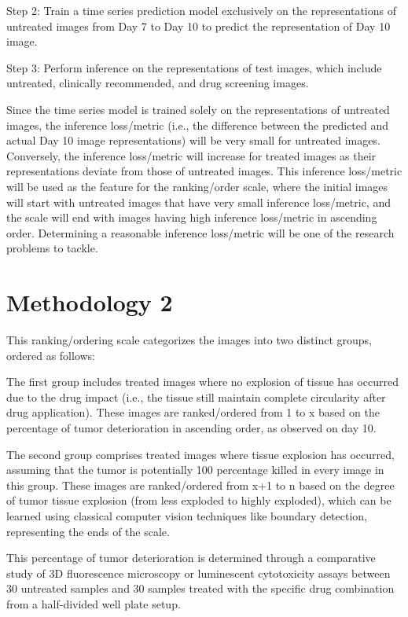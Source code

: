 \documentclass[12pt,twoside,a4paper,parskip]{scrbook} %
\begin{document}
Step 2: Train a time series prediction model exclusively on the representations of untreated images from Day 7 to Day 10 to predict the representation of Day 10 image.

Step 3: Perform inference on the representations of test images, which include untreated, clinically recommended, and drug screening images.

Since the time series model is trained solely on the representations of untreated images, the inference loss/metric (i.e., the difference between the predicted and actual Day 10 image representations) will be very small for untreated images. Conversely, the inference loss/metric will increase for treated images as their representations deviate from those of untreated images. This inference loss/metric will be used as the feature for the ranking/order scale, where the initial images will start with untreated images that have very small inference loss/metric, and the scale will end with images having high inference loss/metric in ascending order. Determining a reasonable inference loss/metric will be one of the research problems to tackle.
\section{Methodology 2}

This ranking/ordering scale categorizes the images into two distinct groups, ordered as follows:

The first group includes treated images where no explosion of tissue has occurred due to the drug impact (i.e., the tissue still maintain complete circularity after drug application). These images are ranked/ordered from 1 to x based on the percentage of tumor deterioration in ascending order, as observed on day 10.

The second group comprises treated images where tissue explosion has occurred, assuming that the tumor is potentially 100 percentage killed in every image in this group. These images are ranked/ordered from x+1 to n based on the degree of tumor tissue explosion (from less exploded to highly exploded), which can be learned using classical computer vision techniques like boundary detection, representing the ends of the scale.

This percentage of tumor deterioration is determined through a comparative study of 3D fluorescence microscopy or luminescent cytotoxicity assays between 30 untreated samples and 30 samples treated with the specific drug combination from a half-divided well plate setup.
\end{document}
